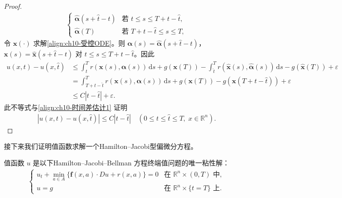 \documentclass[../../main.tex]{subfiles}
\begin{document}
\begin{proof}
\begin{align*}
\begin{cases}
\widehat{\boldsymbol{\alpha}}(s+\widehat{t}-t) & \text{若 } t\leqslant s\leqslant T+t-\widehat{t},\\
\widehat{\boldsymbol{\alpha}}(T) & \text{若 } T+t-\widehat{t}\leqslant s\leqslant T,
\end{cases}
\end{align*}
令 $\mathbf{x}(\cdot)$ 求解\eqref{align:ch10-受控ODE}。则 $\boldsymbol{\alpha}(s)=\widehat{\boldsymbol{\alpha}}(s+\widehat{t}-t)$，$\mathbf{x}(s)=\widehat{\mathbf{x}}(s+\widehat{t}-t)$ 对 $t\leqslant s\leqslant T+t-\widehat{t}$。因此
\begin{align*}
u(x,t)-u(x,\widehat{t}) &\leqslant \int_t^T r(\mathbf{x}(s),\boldsymbol{\alpha}(s))\,\mathrm{d}s+g(\mathbf{x}(T))-\int_{\widehat{t}}^T r(\widehat{\mathbf{x}}(s),\widehat{\boldsymbol{\alpha}}(s))\,\mathrm{d}s-g(\widehat{\mathbf{x}}(T))+\varepsilon\\
&= \int_{T+t-\widehat{t}}^T r(\mathbf{x}(s),\boldsymbol{\alpha}(s))\,\mathrm{d}s+g(\mathbf{x}(T))-g(\mathbf{x}(T+t-\widehat{t}))+\varepsilon\\
&\leqslant C|t-\widehat{t}|+\varepsilon.
\end{align*}
此不等式与\eqref{align:ch10-时间差估计1} 证明
\begin{align*}
|u(x,t)-u(x,\widehat{t})|\leqslant C|t-\widehat{t}| \quad (0\leqslant t\leqslant\widehat{t}\leqslant T,\;x\in\mathbb{R}^n).
\end{align*}
\end{proof}

接下来我们证明值函数求解一个Hamilton--Jacobi型偏微分方程。

\begin{theorem}[值函数的偏微分方程。]\label{theorem:ch10-值函数PDE}值函数 $u$ 是以下Hamilton--Jacobi--Bellman 方程终端值问题的唯一粘性解：
\begin{align}
\begin{cases}
u_t+\displaystyle\min_{a\in A}\{\mathbf{f}(x,a)\cdot Du+r(x,a)\}=0 & \text{在 } \mathbb{R}^n\times(0,T) \text{ 中},\\
u=g & \text{在 } \mathbb{R}^n\times\{t=T\} \text{ 上}.
\end{cases}
\label{align:ch10-HJB方程}
\end{align}
\end{theorem}
\end{document}
